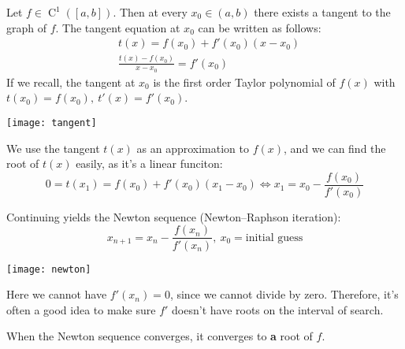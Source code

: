 \begin{definition}
    Let $f \in \operatorname{C}^1([a, b])$. Then at every 
    $x_0 \in (a, b)$ there exists a tangent to the graph of $f$.
    The tangent equation at $x_0$ can be written as follows:
    \begin{align*}
        &
        t(x) = f(x_0) + f'(x_0)(x - x_0)
        \\&
        \frac{t(x) - f(x_0)}{x - x_0} = f'(x_0)
    \end{align*}
    If we recall, the tangent at $x_0$ is the first order Taylor polynomial of $f(x)$
    with $t(x_0) = f(x_0),\ t'(x) = f'(x_0)$.
    \pagebreak
    \begin{figure*}[h]
        \centering
        \texttt{[image: tangent]}
    \end{figure*}

    We use the tangent $t(x)$ as an approximation to $f(x)$,
    and we can find the root of $t(x)$ easily, as it's a linear funciton:
    \[
        0 = t(x_1) = f(x_0) + f'(x_0)(x_1 - x_0) \Longleftrightarrow
        x_1 = x_0 - \frac{f(x_0)}{f'(x_0)}
    \]

    Continuing yields the Newton sequence (Newton–Raphson iteration):
    \[ x_{n + 1} = x_n - \frac{f(x_n)}{f'(x_n)},\ x_0 = \text{initial guess} \]

    \begin{figure*}[h]
        \centering
        \texttt{[image: newton]}
    \end{figure*}

    Here we cannot have $f'(x_n) = 0$, since we cannot divide by zero. Therefore,
    it's often a good idea to make sure $f'$ doesn't have roots on the interval
    of search.
\end{definition}
\begin{theorem}
    When the Newton sequence converges, it converges to
    \textbf{a} root of $f$.
\end{theorem}